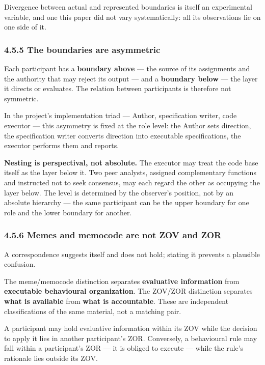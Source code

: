 Divergence between actual and represented boundaries is itself an experimental variable, and one this paper did not vary systematically: all its observations lie on one side of it.


\subsubsection*{4.5.5 The boundaries are asymmetric}
\label{sec:en:4.5.5}

Each participant has a \textbf{boundary above} — the source of its assignments and the authority that may reject its output — and a \textbf{boundary below} — the layer it directs or evaluates. The relation between participants is therefore not symmetric.

In the project's implementation triad — Author, specification writer, code executor — this asymmetry is fixed at the role level: the Author sets direction, the specification writer converts direction into executable specifications, the executor performs them and reports.

\textbf{Nesting is perspectival, not absolute.} The executor may treat the code base itself as the layer below it. Two peer analysts, assigned complementary functions and instructed not to seek consensus, may each regard the other as occupying the layer below. The level is determined by the observer's position, not by an absolute hierarchy — the same participant can be the upper boundary for one role and the lower boundary for another.


\subsubsection*{4.5.6 Memes and memocode are not ZOV and ZOR}
\label{sec:en:4.5.6}

A correspondence suggests itself and does not hold; stating it prevents a plausible confusion.

The meme/memocode distinction separates \textbf{evaluative information} from \textbf{executable behavioural organization}. The ZOV/ZOR distinction separates \textbf{what is available} from \textbf{what is accountable}. These are independent classifications of the same material, not a matching pair.

A participant may hold evaluative information within its ZOV while the decision to apply it lies in another participant's ZOR. Conversely, a behavioural rule may fall within a participant's ZOR — it is obliged to execute — while the rule's rationale lies outside its ZOV.

